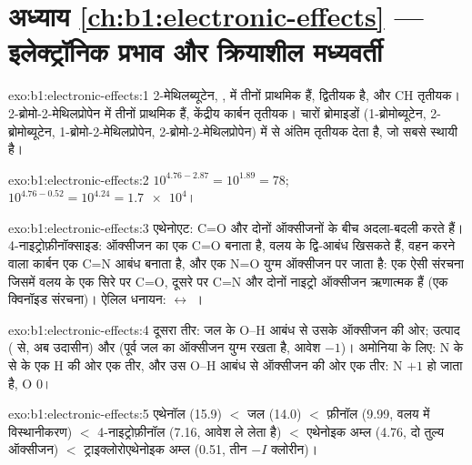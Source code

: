 \section*{अध्याय \ref{ch:b1:electronic-effects} --- इलेक्ट्रॉनिक प्रभाव और क्रियाशील मध्यवर्ती}

\begin{solution}{exo:b1:electronic-effects:1}
2-मेथिलब्यूटेन, , में तीनों  प्राथमिक हैं,
 द्वितीयक है, और CH तृतीयक। 2-ब्रोमो-2-मेथिलप्रोपेन में तीनों
 प्राथमिक हैं, केंद्रीय कार्बन तृतीयक। चारों ब्रोमाइडों
 (1-ब्रोमोब्यूटेन, 2-ब्रोमोब्यूटेन, 1-ब्रोमो-2-मेथिलप्रोपेन,
2-ब्रोमो-2-मेथिलप्रोपेन) में से अंतिम तृतीयक  देता है, जो
सबसे स्थायी है।
\end{solution}

\begin{solution}{exo:b1:electronic-effects:2}
$10^{4.76 - 2.87} = 10^{1.89} = 78$; $10^{4.76 - 0.52} = 10^{4.24} =
\num{1.7e4}$।
\end{solution}

\begin{solution}{exo:b1:electronic-effects:3}
एथेनोएट: C=O और  दोनों ऑक्सीजनों के बीच अदला-बदली करते हैं।
4-नाइट्रोफ़ीनॉक्साइड: ऑक्सीजन का  एक C=O बनाता है, वलय के द्वि-आबंध
खिसकते हैं,  वहन करने वाला कार्बन एक C=N आबंध बनाता है, और एक N=O युग्म
ऑक्सीजन पर जाता है: एक ऐसी संरचना जिसमें वलय के एक सिरे पर C=O, दूसरे पर C=N
और दोनों नाइट्रो ऑक्सीजन ऋणात्मक हैं (एक क्विनॉइड संरचना)। ऐलिल धनायन:
 $\leftrightarrow$ ।
\end{solution}

\begin{solution}{exo:b1:electronic-effects:4}
दूसरा तीर: जल के O--H आबंध से उसके ऑक्सीजन की ओर; उत्पाद 
( से, अब उदासीन) और  (पूर्व जल का ऑक्सीजन
युग्म रखता है, आवेश $-1$)। अमोनिया के लिए: N के  से
 के एक H की ओर एक तीर, और उस O--H आबंध से ऑक्सीजन की ओर एक तीर: N
$+1$ हो जाता है, O 0।
\end{solution}

\begin{solution}{exo:b1:electronic-effects:5}
एथेनॉल (15.9) $<$ जल (14.0) $<$ फ़ीनॉल (9.99, वलय में विस्थानीकरण) $<$
4-नाइट्रोफ़ीनॉल (7.16,  आवेश ले लेता है) $<$ एथेनोइक अम्ल (4.76,
दो तुल्य ऑक्सीजन) $<$ ट्राइक्लोरोएथेनोइक अम्ल (0.51, तीन $-I$
क्लोरीन)।
\end{solution}

